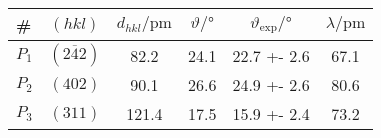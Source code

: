 \begin{tabular}{lcSSSS}
\toprule

{\#} & {$(hkl)$} & {$d_{hkl} / \si{\pico\metre}$} & {$\vartheta / \si{\degree}$} & {$\vartheta_\mathrm{exp} / \si{\degree}$} & {$\lambda / \si{\pico\metre}$} \\

\midrule

$P_1$ & $(2\overline{4}2)$ & 82.2 & 24.1 & 22.7 +- 2.6 & 67.1\\
$P_2$ & $(402)$ & 90.1 & 26.6 & 24.9 +- 2.6 & 80.6\\
$P_3$ & $(311)$ & 121.4 & 17.5 & 15.9 +- 2.4 & 73.2\\

\bottomrule
\end{tabular}